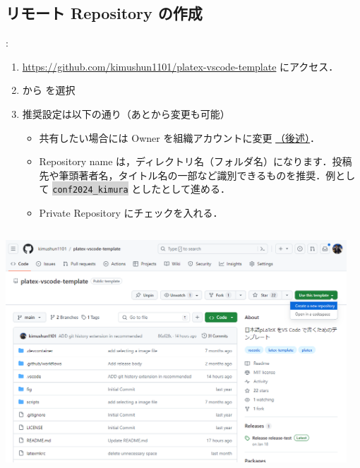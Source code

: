 \documentclass[aspectratio=169,dvipdfmx,cjk]{beamer}
\newcommand{\cmdline}[1]{
    \colorbox{lightgray}{\lstinline[style=command]{#1}}
}
\begin{document}
\subsection{リモート Repository の作成}
\begin{frame}[label=create-repo]{\insertsection \thesubsection: \insertsubsection}
  \begin{enumerate}
    \item \href{https://github.com/kimushun1101/platex-vscode-template}{https://github.com/kimushun1101/platex-vscode-template} にアクセス．
    \item {} から  を選択
    \item 推奨設定は以下の通り（あとから変更も可能）
    \begin{itemize}
      \item 共有したい場合には Owner を組織アカウントに変更 \hyperlink{organization}{（後述）}．
      \item Repository name は，ディレクトリ名（フォルダ名）になります．投稿先や筆頭著者名，タイトル名の一部など識別できるものを推奨．例として \cmdline{conf2024_kimura} としたとして進める．
      \item Private Repository にチェックを入れる．
    \end{itemize}
  \end{enumerate}
  \begin{columns}
    \begin{column}{0.4\textwidth}
        \includegraphics[width=1.0\linewidth]{fig/platex-vecode-temp.png}
    \end{column}
    \begin{column}{0.28\textwidth}

\end{column}
\end{columns}
\end{frame}
\end{document}
